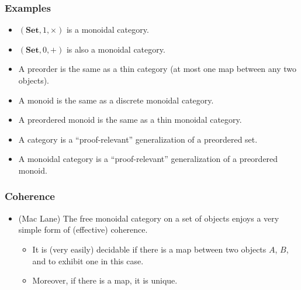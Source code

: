 \documentclass[10pt,t]{beamer}
\newcommand{\Set}{\mathbf{Set}}
\begin{document}
\begin{frame}

\frametitle{Examples}


\begin{itemize}

\item $(\Set, 1, \times)$ is a monoidal category. 

\item $(\Set, 0, +)$ is also a monoidal category.

\bigskip

\item A preorder is the same as a thin category  (at
  most one map between any two objects).

\item A monoid is the same as a discrete monoidal category. 

\item A preordered monoid is the same as a thin monoidal category.


\bigskip

\item A category is a ``proof-relevant''  generalization of a preordered set.

\item A monoidal category is a ``proof-relevant'' generalization of a
  preordered monoid.

\end{itemize}


\end{frame}

\begin{frame}

\frametitle{Coherence}

\begin{itemize}

\item (Mac Lane) The free monoidal category on a set of objects enjoys
  a very simple form of (effective) coherence.

\begin{itemize}
\item It is (very easily) decidable if there is a map between two
  objects $A$, $B$, and to exhibit one in this case.

\item Moreover, if there is a map, it is unique.
\end{itemize}

\end{itemize}

\end{frame}
\end{document}
